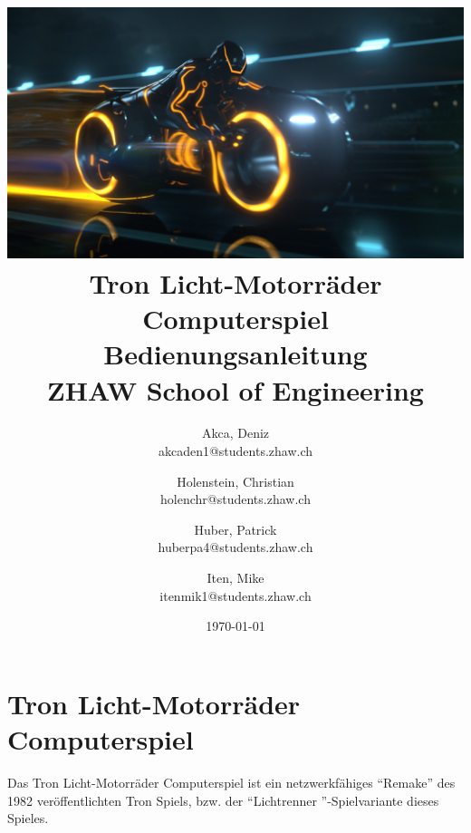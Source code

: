 \documentclass[11pt,ngerman]{article}
\newcommand{\quotes}[1]{``#1''}
\begin{document}
    \title{\includegraphics[width=1\textwidth]{figures/Tron-Legacy_Bike.jpg}\\ Tron Licht-Motorräder Computerspiel\\
        \vspace{1cm}
        Bedienungsanleitung \\
        \vspace{0.5cm}
        \small{}ZHAW  School of Engineering
        \vspace{1.cm}
    }
    \author{
        Akca, Deniz\\
        \small{akcaden1@students.zhaw.ch}
        \and
        Holenstein, Christian\\
        \small{holenchr@students.zhaw.ch}
        \and
        Huber, Patrick\\
        \small{huberpa4@students.zhaw.ch}
        \and
        Iten, Mike\\
        \small{itenmik1@students.zhaw.ch}
        \vspace{1.5cm}
    }
   \date{\today}

    \maketitle

    \newpage

    \tableofcontents
	\listoffigures
    \newpage

    \section{Tron Licht-Motorräder Computerspiel}
    Das Tron Licht-Motorräder Computerspiel ist ein netzwerkfähiges \quotes{Remake} des 1982 veröffentlichten Tron Spiels, bzw.  der \quotes{Lichtrenner }-Spielvariante dieses Spieles.
\end{document}
